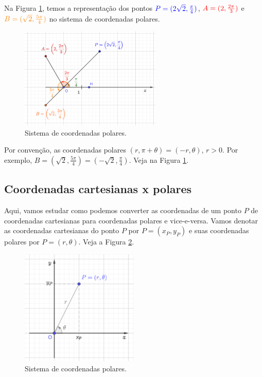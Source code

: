 \begin{ex}
  Na Figura \ref{fig:ex_osc_scp}, temos a representação dos pontos ${\color{blue}P=(2\sqrt{2}, \frac{\pi}{4})}$, ${\color{red}A=(2, \frac{2\pi}{3})}$ e ${\color{orange}B=(\sqrt{2}, \frac{5\pi}{4})}$ no sistema de coordenadas polares.

\begin{figure}[H]
  \centering
  \includegraphics[width=0.6\textwidth]{cap_osc/dados/fig_ex_osc_scp/fig}
  \caption{Sistema de coordenadas polares.}
  \label{fig:ex_osc_scp}
\end{figure}  
\end{ex}

\begin{obs}
  Por convenção, as coordenadas polares $(r, \pi + \theta) = (-r, \theta)$, $r>0$. Por exemplo, $B=(\sqrt{2}, \frac{5\pi}{4}) = (-\sqrt{2}, \frac{\pi}{4})$. Veja na Figura \ref{fig:ex_osc_scp}.
\end{obs}

\subsection{Coordenadas cartesianas x polares}

Aqui, vamos estudar como podemos converter as coordenadas de um ponto $P$ de coordenadas cartesianas para coordenadas polares e vice-e-versa. Vamos denotar as coordenadas cartesianas do ponto $P$ por $P=(x_P, y_P)$ e suas coordenadas polares por $P=(r, \theta)$. Veja a Figura \ref{fig:osc_ccxcp}.

\begin{figure}[H]
  \centering
  \includegraphics[width=0.5\textwidth]{cap_osc/dados/fig_osc_ccxcp/fig}
  \caption{Sistema de coordenadas polares.}
  \label{fig:osc_ccxcp}
\end{figure}  

